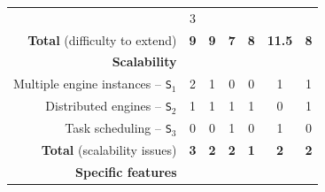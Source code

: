 \documentclass[preprint,3p,twocolumn]{elsarticle}
\begin{document}
\begin{table}
\begin{tabular}{rcccccc}
                                     & \cellcolor[HTML]{99DD99}3\\
  \textbf{Total} (difficulty to extend) & \cellcolor[HTML]{99D199}\textbf{9}
                                     & \cellcolor[HTML]{99D199}\textbf{9}
                                     & \cellcolor[HTML]{99FF99}\textbf{7}
                                     & \cellcolor[HTML]{99E899}\textbf{8}
                                     & \cellcolor[HTML]{999999}\textbf{11.5}
                                     & \cellcolor[HTML]{99E899}\textbf{8}\\
\cellcolor[HTML]{EEEEEE}\textbf{Scalability}& \multicolumn{6}{l}{\cellcolor[HTML]{EEEEEE}}\\
Multiple engine instances -- \texttt{S$_1$}& \cellcolor[HTML]{999999}2
                                     & \cellcolor[HTML]{99CC99}1
                                     & \cellcolor[HTML]{99FF99}0
                                     & \cellcolor[HTML]{99FF99}0
                                     & \cellcolor[HTML]{99CC99}1
                                     & \cellcolor[HTML]{99CC99}1\\
Distributed engines -- \texttt{S$_2$}& \cellcolor[HTML]{999999}1
                                     & \cellcolor[HTML]{999999}1
                                     & \cellcolor[HTML]{999999}1
                                     & \cellcolor[HTML]{999999}1
                                     & \cellcolor[HTML]{99FF99}0
                                     & \cellcolor[HTML]{999999}1\\
Task scheduling -- \texttt{S$_3$}    & \cellcolor[HTML]{99FF99}0
                                     & \cellcolor[HTML]{99FF99}0
                                     & \cellcolor[HTML]{999999}1
                                     & \cellcolor[HTML]{99FF99}0
                                     & \cellcolor[HTML]{999999}1
                                     & \cellcolor[HTML]{99FF99}0\\
\textbf{Total} (scalability issues)  & \cellcolor[HTML]{999999}\textbf{3}
                                     & \cellcolor[HTML]{99CC99}\textbf{2}
                                     & \cellcolor[HTML]{99CC99}\textbf{2}
                                     & \cellcolor[HTML]{99FF99}\textbf{1}
                                     & \cellcolor[HTML]{99CC99}\textbf{2}
                                     & \cellcolor[HTML]{99CC99}\textbf{2}\\
\cellcolor[HTML]{EEEEEE}\textbf{Specific features}& \multicolumn{6}{l}{\cellcolor[HTML]{EEEEEE}}\\

\end{tabular}
\end{table}
\end{document}
